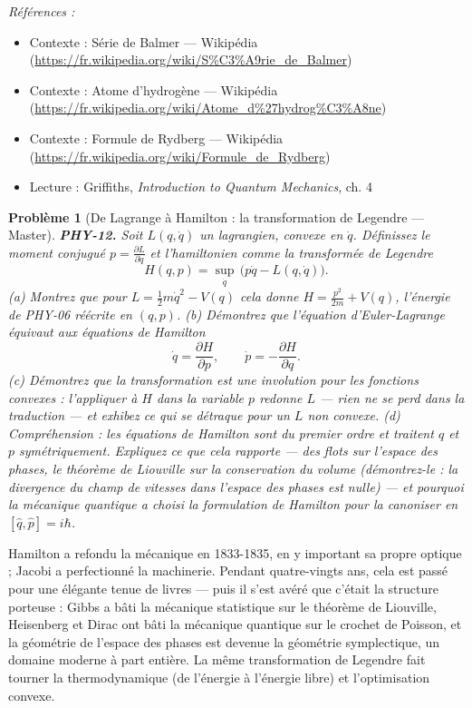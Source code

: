 \documentclass[11pt]{article}
\newtheorem{problem}{Problème}
\newenvironment{refs}{\par\small\noindent\emph{Références :}\begin{itemize}\setlength\itemsep{0pt}}{\end{itemize}\normalsize}
\begin{document}
\begin{refs}
\item Contexte : Série de Balmer --- Wikipédia (\url{https://fr.wikipedia.org/wiki/S%C3%A9rie_de_Balmer})
\item Contexte : Atome d'hydrogène --- Wikipédia (\url{https://fr.wikipedia.org/wiki/Atome_d%27hydrog%C3%A8ne})
\item Contexte : Formule de Rydberg --- Wikipédia (\url{https://fr.wikipedia.org/wiki/Formule_de_Rydberg})
\item Lecture : Griffiths, \textit{Introduction to Quantum Mechanics}, ch. 4
\end{refs}

\bigskip

\begin{problem}[{De Lagrange à Hamilton : la transformation de Legendre --- Master}]
\textbf{PHY-12.} Soit $L(q, \dot q)$ un lagrangien, convexe en $\dot q$.
Définissez le moment conjugué $p = \frac{\partial L}{\partial \dot q}$ et l'hamiltonien comme la
transformée de Legendre
\[ H(q, p) = \sup_{\dot q}\,\bigl(p\dot q - L(q, \dot q)\bigr). \]
(a) Montrez que pour $L = \tfrac12 m\dot q^2 - V(q)$ cela donne $H = \frac{p^2}{2m} + V(q)$,
l'énergie de PHY-06 réécrite en $(q, p)$. (b) Démontrez que l'équation d'Euler-Lagrange équivaut
aux équations de Hamilton
\[ \dot q = \frac{\partial H}{\partial p}, \qquad \dot p = -\frac{\partial H}{\partial q}. \]
(c) Démontrez que la transformation est une involution pour les fonctions convexes : l'appliquer à
$H$ dans la variable $p$ redonne $L$ --- rien ne se perd dans la traduction --- et exhibez ce
qui se détraque pour un $L$ non convexe. (d) Compréhension : les équations de Hamilton sont du
premier ordre et traitent $q$ et $p$ symétriquement. Expliquez ce que cela rapporte --- des flots
sur l'espace des phases, le théorème de Liouville sur la conservation du volume (démontrez-le : la
divergence du champ de vitesses dans l'espace des phases est nulle) --- et pourquoi la mécanique
quantique a choisi la formulation de Hamilton pour la canoniser en
$[\hat q, \hat p] = i\hbar$.
\end{problem}

\noindent Hamilton a refondu la mécanique en 1833-1835, en y important sa propre
optique ; Jacobi a perfectionné la machinerie. Pendant quatre-vingts ans, cela est passé pour une
élégante tenue de livres --- puis il s'est avéré que c'était la structure porteuse : Gibbs a bâti
la mécanique statistique sur le théorème de Liouville, Heisenberg et Dirac ont bâti la mécanique
quantique sur le crochet de Poisson, et la géométrie de l'espace des phases est devenue la
géométrie symplectique, un domaine moderne à part entière. La même transformation de Legendre fait
tourner la thermodynamique (de l'énergie à l'énergie libre) et l'optimisation convexe.
\end{document}
